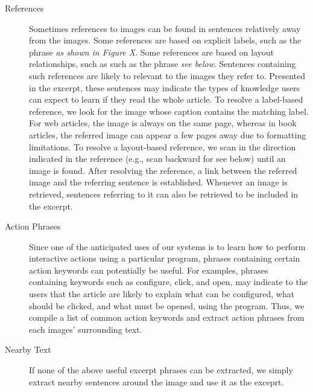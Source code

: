 \documentclass{www2010-submission}
\begin{document}
\begin{description}
\item[References] Sometimes references to images can be found in
  sentences relatively away from the images. Some references are based
  on explicit labels, such as the phrase \emph{as shown in Figure
    X}. Some references are based on layout relationships, such as
  such as the phrase \emph{see below}. Sentences containing such
  references are likely to relevant to the images they refer
  to. Presented in the excerpt, these sentences may indicate the types
  of knowledge users can expect to learn if they read the whole
  article. To resolve a label-based reference, we look for the image
  whose caption contains the matching label. For web articles, the
  image is always on the same page, whereas in book articles, the
  referred image can appear a few pages away due to formatting
  limitations. To resolve a layout-based reference, we scan in the
  direction indicated in the reference (e.g., scan backward for see
  below) until an image is found. After resolving the reference, a
  link between the referred image and the referring sentence is
  established. Whenever an image is retrieved, sentences referring to
  it can also be retrieved to be included in the excerpt.

\item[Action Phrases] Since one of the anticipated uses of our systems
  is to learn how to perform interactive actions using a particular
  program, phrases containing certain action keywords can potentially
  be useful. For examples, phrases containing keywords such as
  configure, click, and open, may indicate to the users that the
  article are likely to explain what can be configured, what should be
  clicked, and what must be opened, using the program. Thus, we
  compile a list of common action keywords and extract action phrases
  from each images' surrounding text.

\item[Nearby Text] If none of the above useful excerpt phrases can be
  extracted, we simply extract nearby sentences around the image and
  use it as the exceprt.


\end{description}
\end{document}
